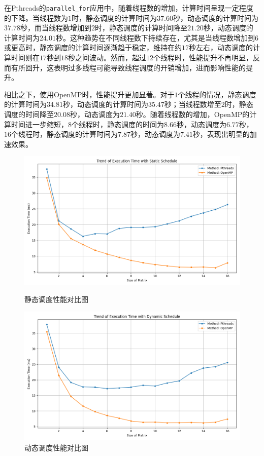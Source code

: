 \documentclass[a4paper, utf8]{ctexart}
\begin{document}
	在Pthreads的\verb|parallel_for|应用中，随着线程数的增加，计算时间呈现一定程度的下降。当线程数为$1$时，静态调度的计算时间为$37.60$秒，动态调度的计算时间为$37.78$秒，而当线程数增加到$2$时，静态调度的计算时间降至$21.20$秒，动态调度的计算时间为$24.01$秒。这种趋势在不同线程数下持续存在，尤其是当线程数增加到$6$或更高时，静态调度的计算时间逐渐趋于稳定，维持在约$17$秒左右，动态调度的计算时间则在$17$秒到$18$秒之间波动。然而，超过$12$个线程时，性能提升不再明显，反而有所回升，这表明过多线程可能导致线程调度的开销增加，进而影响性能的提升。
	
	相比之下，使用OpenMP时，性能提升更加显著。对于$1$个线程的情况，静态调度的计算时间为$34.81$秒，动态调度的计算时间为$35.47$秒；当线程数增至$2$时，静态调度的时间降至$20.08$秒，动态调度为$21.40$秒。随着线程数的增加，OpenMP的计算时间进一步缩短，$8$个线程时，静态调度的时间为$8.66$秒，动态调度为$6.77$秒，$16$个线程时，静态调度的计算时间为$7.87$秒，动态调度为$7.41$秒，表现出明显的加速效果。
	
	\begin{figure}[htbp]
		\centering
		\begin{minipage}{.45\textwidth}
			\centering
			\includegraphics[width=.8\textwidth]{./figure/static_time_trend.png}
			\caption{静态调度性能对比图}
		\end{minipage}
		\begin{minipage}{.45\textwidth}
			\centering
			\includegraphics[width=.8\textwidth]{./figure/dynamic_time_trend.png}
			\caption{动态调度性能对比图}
		\end{minipage}
	\end{figure}
	
\end{document}

